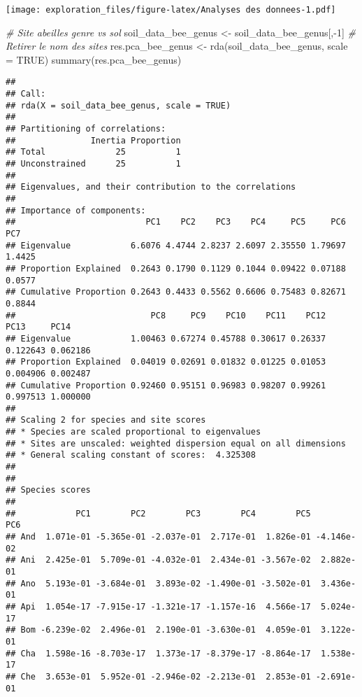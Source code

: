 \documentclass[
]{article}
\newenvironment{Shaded}{\begin{snugshade}}{\end{snugshade}}
\newcommand{\AttributeTok}[1]{\textcolor[rgb]{0.77,0.63,0.00}{#1}}
\newcommand{\CommentTok}[1]{\textcolor[rgb]{0.56,0.35,0.01}{\textit{#1}}}
\newcommand{\ConstantTok}[1]{\textcolor[rgb]{0.00,0.00,0.00}{#1}}
\newcommand{\DecValTok}[1]{\textcolor[rgb]{0.00,0.00,0.81}{#1}}
\newcommand{\FunctionTok}[1]{\textcolor[rgb]{0.00,0.00,0.00}{#1}}
\newcommand{\NormalTok}[1]{#1}
\newcommand{\OtherTok}[1]{\textcolor[rgb]{0.56,0.35,0.01}{#1}}
\newcommand{\SpecialCharTok}[1]{\textcolor[rgb]{0.00,0.00,0.00}{#1}}
\begin{document}
\texttt{[image: exploration\_files/figure-latex/Analyses des donnees-1.pdf]}

\begin{Shaded}
\begin{Highlighting}[]
\CommentTok{\# Site abeilles genre vs sol}
\NormalTok{soil\_data\_bee\_genus }\OtherTok{\textless{}{-}}\NormalTok{ soil\_data\_bee\_genus[,}\SpecialCharTok{{-}}\DecValTok{1}\NormalTok{] }\CommentTok{\# Retirer le nom des sites}
\NormalTok{res.pca\_bee\_genus }\OtherTok{\textless{}{-}} \FunctionTok{rda}\NormalTok{(soil\_data\_bee\_genus, }\AttributeTok{scale =} \ConstantTok{TRUE}\NormalTok{)}
\FunctionTok{summary}\NormalTok{(res.pca\_bee\_genus)}
\end{Highlighting}
\end{Shaded}

\begin{verbatim}
## 
## Call:
## rda(X = soil_data_bee_genus, scale = TRUE) 
## 
## Partitioning of correlations:
##               Inertia Proportion
## Total              25          1
## Unconstrained      25          1
## 
## Eigenvalues, and their contribution to the correlations 
## 
## Importance of components:
##                          PC1    PC2    PC3    PC4     PC5     PC6    PC7
## Eigenvalue            6.6076 4.4744 2.8237 2.6097 2.35550 1.79697 1.4425
## Proportion Explained  0.2643 0.1790 0.1129 0.1044 0.09422 0.07188 0.0577
## Cumulative Proportion 0.2643 0.4433 0.5562 0.6606 0.75483 0.82671 0.8844
##                           PC8     PC9    PC10    PC11    PC12     PC13     PC14
## Eigenvalue            1.00463 0.67274 0.45788 0.30617 0.26337 0.122643 0.062186
## Proportion Explained  0.04019 0.02691 0.01832 0.01225 0.01053 0.004906 0.002487
## Cumulative Proportion 0.92460 0.95151 0.96983 0.98207 0.99261 0.997513 1.000000
## 
## Scaling 2 for species and site scores
## * Species are scaled proportional to eigenvalues
## * Sites are unscaled: weighted dispersion equal on all dimensions
## * General scaling constant of scores:  4.325308 
## 
## 
## Species scores
## 
##            PC1        PC2        PC3        PC4        PC5        PC6
## And  1.071e-01 -5.365e-01 -2.037e-01  2.717e-01  1.826e-01 -4.146e-02
## Ani  2.425e-01  5.709e-01 -4.032e-01  2.434e-01 -3.567e-02  2.882e-01
## Ano  5.193e-01 -3.684e-01  3.893e-02 -1.490e-01 -3.502e-01  3.436e-01
## Api  1.054e-17 -7.915e-17 -1.321e-17 -1.157e-16  4.566e-17  5.024e-17
## Bom -6.239e-02  2.496e-01  2.190e-01 -3.630e-01  4.059e-01  3.122e-01
## Cha  1.598e-16 -8.703e-17  1.373e-17 -8.379e-17 -8.864e-17  1.538e-17
## Che  3.653e-01  5.952e-01 -2.946e-02 -2.213e-01  2.853e-01 -2.691e-01

\end{verbatim}
\end{document}
